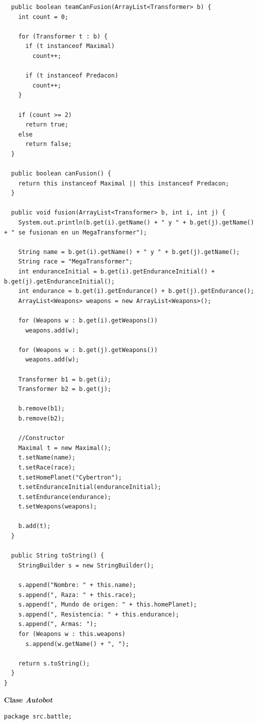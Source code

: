 \documentclass[12pt]{article}
\begin{document}
\begin{enumerate}[label = \arabic{enumi}]
\begin{lstlisting}
  public boolean teamCanFusion(ArrayList<Transformer> b) {
    int count = 0;

    for (Transformer t : b) {
      if (t instanceof Maximal)
        count++;
      
      if (t instanceof Predacon)
        count++;
    }

    if (count >= 2)
      return true;
    else 
      return false;
  }

  public boolean canFusion() {
    return this instanceof Maximal || this instanceof Predacon;
  }

  public void fusion(ArrayList<Transformer> b, int i, int j) {
    System.out.println(b.get(i).getName() + " y " + b.get(j).getName() + " se fusionan en un MegaTransformer");

    String name = b.get(i).getName() + " y " + b.get(j).getName();
    String race = "MegaTransformer";
    int enduranceInitial = b.get(i).getEnduranceInitial() + b.get(j).getEnduranceInitial();
    int endurance = b.get(i).getEndurance() + b.get(j).getEndurance();
    ArrayList<Weapons> weapons = new ArrayList<Weapons>();
    
    for (Weapons w : b.get(i).getWeapons())
      weapons.add(w);

    for (Weapons w : b.get(j).getWeapons())
      weapons.add(w);

    Transformer b1 = b.get(i);
    Transformer b2 = b.get(j);

    b.remove(b1);
    b.remove(b2);

    //Constructor
    Maximal t = new Maximal();
    t.setName(name);
    t.setRace(race);
    t.setHomePlanet("Cybertron");
    t.setEnduranceInitial(enduranceInitial);
    t.setEndurance(endurance);
    t.setWeapons(weapons);
    
    b.add(t);
  }

  public String toString() {
    StringBuilder s = new StringBuilder();

    s.append("Nombre: " + this.name);
    s.append(", Raza: " + this.race);
    s.append(", Mundo de origen: " + this.homePlanet);
    s.append(", Resistencia: " + this.endurance);
    s.append(", Armas: ");
    for (Weapons w : this.weapons)
      s.append(w.getName() + ", ");

    return s.toString();
  }
}    
    \end{lstlisting}

    \textbf{Clase \textit{Autobot}}
    \begin{lstlisting}
package src.battle;


\end{lstlisting}
\end{enumerate}
\end{document}
